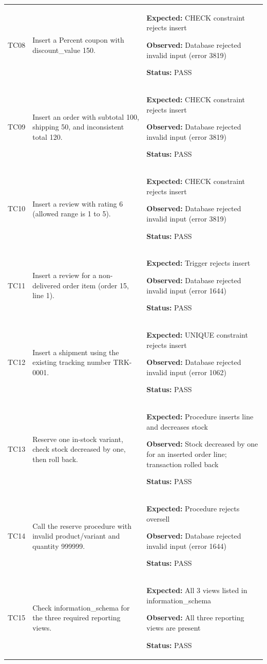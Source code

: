 \documentclass[11pt,a4paper,oneside]{report}
\begin{document}
\begin{longtable}{@{}P{13mm}P{51mm}P{92mm}@{}}
TC08 & Insert a Percent coupon with discount\_value 150. & \textbf{Expected:} CHECK constraint rejects insert\par\textbf{Observed:} Database rejected invalid input (error 3819)\par\textbf{Status:} PASS \\
TC09 & Insert an order with subtotal 100, shipping 50, and inconsistent total 120. & \textbf{Expected:} CHECK constraint rejects insert\par\textbf{Observed:} Database rejected invalid input (error 3819)\par\textbf{Status:} PASS \\
TC10 & Insert a review with rating 6 (allowed range is 1 to 5). & \textbf{Expected:} CHECK constraint rejects insert\par\textbf{Observed:} Database rejected invalid input (error 3819)\par\textbf{Status:} PASS \\
TC11 & Insert a review for a non-delivered order item (order 15, line 1). & \textbf{Expected:} Trigger rejects insert\par\textbf{Observed:} Database rejected invalid input (error 1644)\par\textbf{Status:} PASS \\
TC12 & Insert a shipment using the existing tracking number TRK-0001. & \textbf{Expected:} UNIQUE constraint rejects insert\par\textbf{Observed:} Database rejected invalid input (error 1062)\par\textbf{Status:} PASS \\
TC13 & Reserve one in-stock variant, check stock decreased by one, then roll back. & \textbf{Expected:} Procedure inserts line and decreases stock\par\textbf{Observed:} Stock decreased by one for an inserted order line; transaction rolled back\par\textbf{Status:} PASS \\
TC14 & Call the reserve procedure with invalid product/variant and quantity 999999. & \textbf{Expected:} Procedure rejects oversell\par\textbf{Observed:} Database rejected invalid input (error 1644)\par\textbf{Status:} PASS \\
TC15 & Check information\_schema for the three required reporting views. & \textbf{Expected:} All 3 views listed in information\_schema\par\textbf{Observed:} All three reporting views are present\par\textbf{Status:} PASS \\

\end{longtable}
\end{document}
